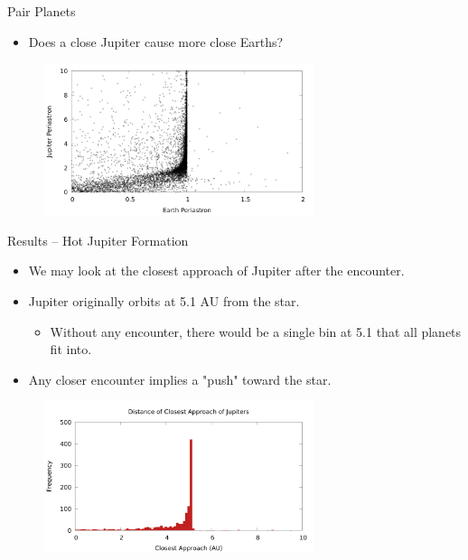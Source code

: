 \documentclass{beamer}
\begin{document}
\begin{frame}{Pair Planets}
    \begin{itemize}
        \item Does a close Jupiter cause more close Earths?
    \end{itemize}
    \begin{figure}
        \includegraphics[height=1.75in]{evj_peri_earth_jupiter_1000.png}
    \end{figure}
\end{frame}

\begin{frame}{Results -- Hot Jupiter Formation}
    \begin{itemize}
        \item We may look at the closest approach of Jupiter after the encounter.
        \item Jupiter originally orbits at 5.1 AU from the star.
            \begin{itemize}
                \item Without any encounter, there would be a single bin at 5.1 that
                    all planets fit into.
            \end{itemize}
        \item Any closer encounter implies a "push" toward the star.
    \end{itemize}
    \begin{figure}
        \centering
        \includegraphics[height=1.75in]{jupiter_distance_final}
    \end{figure}
\end{frame}
\end{document}
